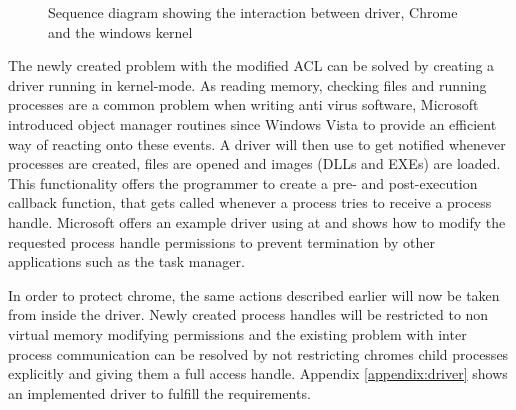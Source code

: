 \begin{figure}[tb] 
 \centering
\caption{Sequence diagram showing the interaction between driver, Chrome and the windows kernel}
\label{fig:sequence}
\end{figure}
\restoregeometry
The newly created problem with the modified \gls{ACL} can be solved by creating a driver running in kernel-mode. As reading memory, checking files and running processes are a common problem when writing anti virus software, Microsoft introduced object manager routines since Windows Vista to provide an efficient way of reacting onto these events. A driver will then use  to get notified whenever processes are created, files are opened and images (\glspl{DLL} and EXEs) are loaded. This functionality offers the programmer to create a pre- and post-execution callback function, that gets called whenever a process tries to receive a process handle. Microsoft offers an example driver using  at \cite{github_obcallback} and shows how to modify the requested process handle permissions to prevent termination by other applications such as the task manager. 

In order to protect chrome, the same actions described earlier will now be taken from inside the driver. Newly created process handles will be restricted to non virtual memory modifying permissions and the existing problem with inter process communication can be resolved by not restricting chromes child processes explicitly and giving them a full access handle. Appendix \ref{appendix:driver} shows an implemented driver to fulfill the requirements.

